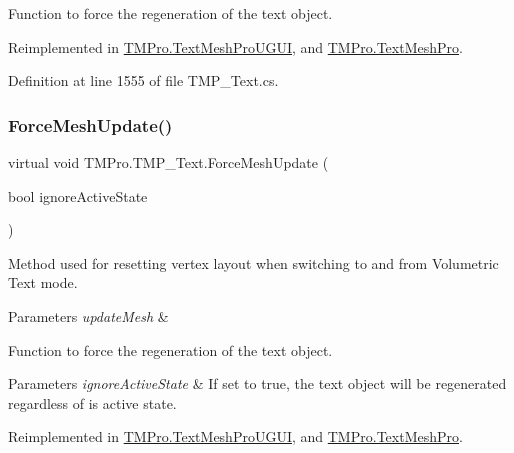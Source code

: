 Function to force the regeneration of the text object. 



Reimplemented in \mbox{\hyperlink{class_t_m_pro_1_1_text_mesh_pro_u_g_u_i_af5d2e586548f3dd722fd804019261304}{T\+M\+Pro.\+Text\+Mesh\+Pro\+U\+G\+UI}}, and \mbox{\hyperlink{class_t_m_pro_1_1_text_mesh_pro_a3b4ae4094196a6522a70ac86cdb30e02}{T\+M\+Pro.\+Text\+Mesh\+Pro}}.



Definition at line 1555 of file T\+M\+P\+\_\+\+Text.\+cs.

\mbox{\label{class_t_m_pro_1_1_t_m_p___text_a2cd34e05c191658295c67c373e608f5d}} 
\subsubsection{\texorpdfstring{ForceMeshUpdate()}{ForceMeshUpdate()}\hspace{0.1cm}{\footnotesize\ttfamily [2/2]}}
{\footnotesize\ttfamily virtual void T\+M\+Pro.\+T\+M\+P\+\_\+\+Text.\+Force\+Mesh\+Update (\begin{DoxyParamCaption}\item[{bool}]{ignore\+Active\+State }\end{DoxyParamCaption})\hspace{0.3cm}{\ttfamily [virtual]}}



Method used for resetting vertex layout when switching to and from Volumetric Text mode. 


\begin{DoxyParams}{Parameters}
{\em update\+Mesh} & \\
\hline
\end{DoxyParams}


Function to force the regeneration of the text object. 


\begin{DoxyParams}{Parameters}
{\em ignore\+Active\+State} & If set to true, the text object will be regenerated regardless of is active state.\\
\hline
\end{DoxyParams}


Reimplemented in \mbox{\hyperlink{class_t_m_pro_1_1_text_mesh_pro_u_g_u_i_aab2c39e0fc65227e83401eeac525f010}{T\+M\+Pro.\+Text\+Mesh\+Pro\+U\+G\+UI}}, and \mbox{\hyperlink{class_t_m_pro_1_1_text_mesh_pro_adba5343dcc85a77bcd3dd57c22dd1753}{T\+M\+Pro.\+Text\+Mesh\+Pro}}.




